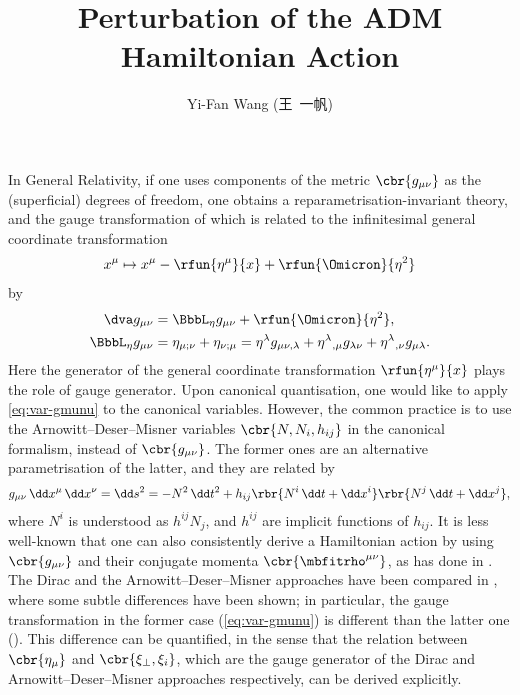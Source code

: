 \documentclass[a4paper,11pt]{article}
\title{Perturbation of the ADM Hamiltonian Action}
\author{Yi-Fan Wang (王\ 一帆)}
\begin{document}
\maketitle

In General Relativity, if one uses components of the metric $\cbr{g_{\mu\nu}}$ 
as the (superficial) degrees of freedom, one obtains a 
reparametrisation-invariant theory, and the gauge transformation of which is 
related to the infinitesimal general coordinate transformation
\begin{align}
x^\mu \mapsto x^\mu - \rfun{\eta^\mu}{x} +
\rfun{\Omicron}{\eta^2}
\end{align}
by
\begin{align}
\dva g_{\mu\nu} &= \BbbL_\eta g_{\mu\nu} + \rfun{\Omicron}{\eta^2},
\nonumber \\
\BbbL_\eta g_{\mu\nu} &= \eta_{\mu;\nu} + \eta_{\nu;\mu}
= \eta^\lambda g_{\mu\nu,\lambda} + 
\eta^{\lambda}{}_{,\mu} g_{\lambda\nu} +
\eta^{\lambda}{}_{,\nu} g_{\mu\lambda}.
\label{eq:var-gmunu}
\end{align}
Here the generator of the general coordinate transformation 
$\rfun{\eta^\mu}{x}$ plays the role of gauge generator. Upon canonical 
quantisation, one would like to apply \cref{eq:var-gmunu} to the canonical 
variables. However, the common practice is to use the Arnowitt--Deser--Misner 
variables $\cbr{N, N_i, h_{ij}}$ in the canonical formalism, instead of 
$\cbr{g_{\mu\nu}}$. The former ones are an alternative parametrisation of the 
latter, and they are related by
\begin{align}
g_{\mu\nu}\,\dd x^\mu\,\dd x^\nu = \dd s^2 = -N^2\,\dd t^2 + h_{ij}
\rbr{N^i\,\dd t + \dd x^i}\rbr{N^j\,\dd t + \dd x^j},
\label{eq:metric-Dirac-ADM}
\end{align}
where $N^i$ is understood as $h^{ij}N_j$, and $h^{ij}$ are implicit functions 
of $h_{ij}$. It is less well-known that one can also consistently derive a 
Hamiltonian action by using $\cbr{g_{\mu\nu}}$ and their conjugate momenta 
$\cbr{\mbfitrho^{\mu\nu}}$, as \citeauthor{Dirac1958} has done in 
\cite{Dirac1958}. The Dirac and the Arnowitt--Deser--Misner approaches have been 
compared in \cite{Kiriushcheva2008}, where some subtle differences have been 
shown; in particular, the gauge transformation in the former case 
(\cref{eq:var-gmunu}) is different than the latter one 
(). This difference can be quantified, in the 
sense that the relation between $\cbr{\eta_\mu}$ and $\cbr{\xi_\perp, \xi_i}$, 
which are the gauge generator of the Dirac and Arnowitt--Deser--Misner 
approaches respectively, can be derived explicitly.
\end{document}
